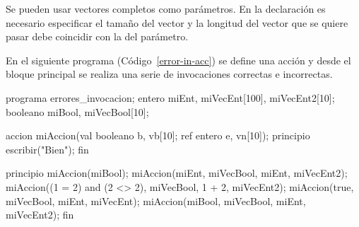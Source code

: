 Se pueden usar vectores completos como parámetros. En la declaración es necesario especificar el tamaño del vector y la longitud del vector que se quiere pasar debe coincidir con la del parámetro.

En el siguiente programa (Código~\ref{error-in-acc}) se define una acción y desde el bloque principal se realiza una serie de invocaciones correctas e incorrectas.

\begin{codigo}[style=minileng, caption={Programa \tt{errores\_invocacion}.}, label={error-in-acc}]
programa errores_invocacion;
entero miEnt, miVecEnt[100], miVecEnt2[10];
booleano miBool, miVecBool[10];

accion miAccion(val booleano b, vb[10]; ref entero e, vn[10]);
principio
    escribir("Bien");
fin

principio
    miAccion(miBool);  %
    miAccion(miEnt, miVecBool, miEnt, miVecEnt2);  %
    miAccion((1 = 2) and (2 <> 2), miVecBool, 1 + 2, miVecEnt2);  %
    miAccion(true, miVecBool, miEnt, miVecEnt);  %
    miAccion(miBool, miVecBool, miEnt, miVecEnt2);  %
fin
\end{codigo}

